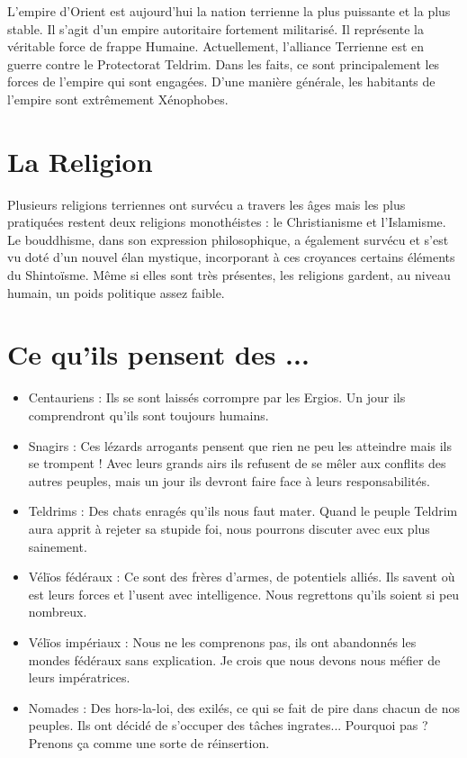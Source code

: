 \begin{multicols}{2}
L'empire d'Orient est aujourd'hui la nation terrienne la plus puissante et la plus stable. Il s'agit d'un empire autoritaire fortement militarisé. Il représente la véritable force de frappe Humaine. Actuellement, l'alliance Terrienne est en guerre contre le Protectorat Teldrim. Dans les faits, ce sont principalement les forces de l'empire qui sont engagées. D'une manière générale, les habitants de l'empire sont extrêmement Xénophobes.

\section{La Religion}

Plusieurs religions terriennes ont survécu a travers les âges mais les plus pratiquées restent deux religions monothéistes : le Christianisme et l'Islamisme. Le bouddhisme, dans son expression philosophique, a également survécu et s'est vu doté d'un nouvel élan mystique, incorporant à ces croyances certains éléments du Shintoïsme. Même si elles sont très présentes, les religions gardent, au niveau humain, un poids politique assez faible.

\section{Ce qu'ils pensent des ...}

\begin{itemize}
\item Centauriens : Ils se sont laissés corrompre par les Ergios. Un jour ils comprendront qu'ils sont toujours humains.
\item Snagirs : Ces lézards arrogants pensent que rien ne peu les atteindre mais ils se trompent ! Avec leurs grands airs ils refusent de se mêler aux conflits des autres peuples, mais un jour ils devront faire face à leurs responsabilités.
\item Teldrims : Des chats enragés qu'ils nous faut mater. Quand le peuple Teldrim aura apprit à rejeter sa stupide foi, nous pourrons discuter avec eux plus sainement.
\item Vélïos fédéraux : Ce sont des frères d'armes, de potentiels alliés. Ils savent où est leurs forces et l'usent avec intelligence. Nous regrettons qu'ils soient si peu nombreux.
\item Vélïos impériaux : Nous ne les comprenons pas, ils ont abandonnés les mondes fédéraux sans explication. Je crois que nous devons nous méfier de leurs impératrices.
\item Nomades : Des hors-la-loi, des exilés, ce qui se fait de pire dans chacun de nos peuples. Ils ont décidé de s'occuper des tâches ingrates... Pourquoi pas ? Prenons ça comme une sorte de réinsertion.
\end{itemize}

\end{multicols}

